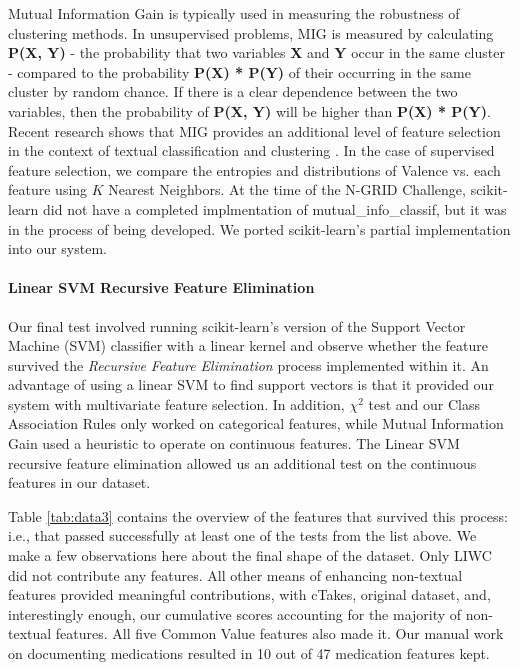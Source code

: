 Mutual Information Gain is typically used in measuring the robustness of clustering methods.
In unsupervised problems, MIG  is measured by calculating \textbf{P(X, Y)} - the probability that two variables \textbf{X} and \textbf{Y} occur in the same cluster - compared to the probability \textbf{P(X) * P(Y)} of their occurring in the same cluster by random chance. If there is a clear dependence  %
between the two variables, then the probability of \textbf{P(X, Y)} will be higher %
than \textbf{P(X) * P(Y)}. Recent research shows that MIG provides an additional level of feature selection in the context of textual classification and clustering \cite{Xu07}. In the case of supervised feature selection, we compare the entropies and distributions of \textsf{Valence} vs. each feature
using $K$ Nearest Neighbors. At the time of the N-GRID Challenge, \textsf{scikit-learn} \cite{scikit-learn}
did not have a completed implmentation of
\textsf{mutual\_info\_classif}, but it was in the process of being developed. We ported \textsf{scikit-learn}'s partial implementation into our system.

\paragraph{Linear SVM Recursive Feature Elimination}
Our final test involved running \textsf{scikit-learn}'s version
of the Support Vector Machine (SVM) classifier with
a linear kernel \cite{cortes95} and observe whether the feature survived the
\textit{Recursive Feature Elimination} process implemented
within it. An advantage of using a linear SVM to find support vectors is that 
it provided our system with multivariate feature selection.
In addition, $\chi^2$ test and our Class Association Rules only worked on categorical features, 
while Mutual Information Gain used a heuristic \cite{Xu07} to operate on continuous features.
The Linear SVM recursive feature elimination allowed us an additional test on
the continuous features in our dataset.

\vspace{0.4cm}

Table \ref{tab:data3} contains the overview of the features that
survived this process: i.e., that passed successfully at least one of
the tests from the list above. We make a few observations here
about the final shape of the dataset. Only \textsf{LIWC} did
not contribute any features. All other means of enhancing
non-textual features provided meaningful contributions, 
with \textsf{cTakes}, original dataset, and, interestingly
enough, our cumulative scores accounting for the
majority of non-textual features.  All five \textsf{Common Value}
features also made it. Our manual work on documenting
medications resulted in 10 out of 47 medication
features kept. 

